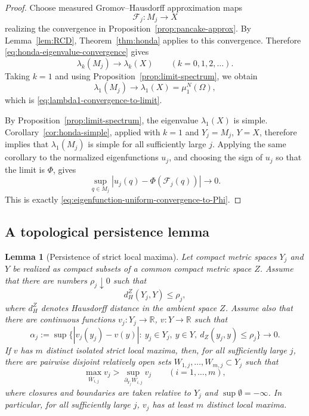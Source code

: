 \documentclass[11pt]{amsart}
\newtheorem{lemma}[theorem]{Lemma}
\numberwithin{equation}{section}
\newcommand{\R}{\mathbb R}
\newcommand{\Om}{\Omega}
\begin{document}
\begin{proof}
Choose measured Gromov--Hausdorff approximation maps
\[
\mathcal F_j:M_j\to X
\]
realizing the convergence in Proposition~\ref{prop:pancake-approx}.  By
Lemma~\ref{lem:RCD}, Theorem~\ref{thm:honda} applies to this convergence.
Therefore \eqref{eq:honda-eigenvalue-convergence} gives
\[
\lambda_k(M_j)\to\lambda_k(X)
\qquad(k=0,1,2,\ldots).
\]
Taking \(k=1\) and using Proposition~\ref{prop:limit-spectrum}, we obtain
\[
\lambda_1(M_j)\to\lambda_1(X)=\mu_1^N(\Om),
\]
which is \eqref{eq:lambda1-convergence-to-limit}.

By Proposition~\ref{prop:limit-spectrum}, the eigenvalue \(\lambda_1(X)\) is
simple.  Corollary~\ref{cor:honda-simple}, applied with \(k=1\) and
\(Y_j=M_j\), \(Y=X\), therefore implies that \(\lambda_1(M_j)\) is simple for all
sufficiently large \(j\).  Applying the same corollary to the normalized
eigenfunctions \(u_j\), and choosing the sign of \(u_j\) so that the limit is
\(\Phi\), gives
\[
\sup_{q\in M_j}
\left|
u_j(q)-\Phi(\mathcal F_j(q))
\right|
\to0 .
\]
This is exactly \eqref{eq:eigenfunction-uniform-convergence-to-Phi}.
\end{proof}

\subsection{A topological persistence lemma}

\begin{lemma}[Persistence of strict local maxima]\label{lem:persistence}
Let compact metric spaces $Y_j$ and $Y$ be realized as compact subsets of a common
compact metric space $Z$.  Assume that there are numbers $\rho_j\downarrow0$ such
that
\begin{equation}\label{eq:persistence-Hausdorff}
d_H^Z(Y_j,Y)\le \rho_j,
\end{equation}
where $d_H^Z$ denotes Hausdorff distance in the ambient space $Z$.  Assume also
that there are continuous functions $v_j:Y_j\to\R$, $v:Y\to\R$ such that
\begin{equation}\label{eq:persistence-alpha}
\alpha_j:=
\sup\bigl\{|v_j(y_j)-v(y)|:\ y_j\in Y_j,\ y\in Y,\ d_Z(y_j,y)\le\rho_j\bigr\}
\longrightarrow0.
\end{equation}
If $v$ has $m$ distinct isolated strict local maxima, then, for all sufficiently
large $j$, there are pairwise disjoint relatively open sets
$W_{1,j},\ldots,W_{m,j}\subset Y_j$ such that
\begin{equation}\label{eq:persistence-boundary-gap-conclusion}
\max_{\overline W_{i,j}}v_j>
\sup_{\partial_{Y_j}W_{i,j}}v_j
\qquad(i=1,\ldots,m),
\end{equation}
where closures and boundaries are taken relative to $Y_j$ and
$\sup\emptyset=-\infty$.  In particular, for all sufficiently large $j$, $v_j$
has at least $m$ distinct local maxima.
\end{lemma}
\end{document}
